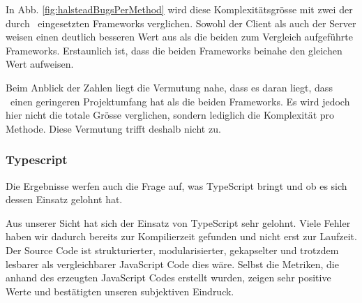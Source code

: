 		In Abb. \ref{fig:halsteadBugsPerMethod} wird diese Komplexitätsgrösse mit zwei der durch \eeppi\ eingesetzten Frameworks verglichen.
		Sowohl der Client als auch der Server weisen einen deutlich besseren Wert aus als die beiden zum Vergleich aufgeführte Frameworks.
		Erstaunlich ist, dass die beiden Frameworks beinahe den gleichen Wert aufweisen.
		
		Beim Anblick der Zahlen liegt die Vermutung nahe, dass es daran liegt,
		dass \eeppi\ einen geringeren Projektumfang hat als die beiden Frameworks.
		Es wird jedoch hier nicht die totale Grösse verglichen, sondern lediglich die Komplexität pro Methode.
		Diese Vermutung trifft deshalb nicht zu.
				
				
	\subsubsection{Typescript}
	Die Ergebnisse werfen auch die Frage auf, was TypeScript bringt und ob es sich dessen Einsatz gelohnt hat.
	
	Aus unserer Sicht hat sich der Einsatz von TypeScript sehr gelohnt. 
	Viele Fehler haben wir dadurch bereits zur Kompilierzeit gefunden und nicht erst zur Laufzeit.
	Der Source Code ist strukturierter, modularisierter, gekapselter und trotzdem lesbarer als vergleichbarer JavaScript Code dies wäre.
	Selbst die Metriken, die anhand des erzeugten JavaScript Codes erstellt wurden, zeigen sehr positive Werte und bestätigten unseren subjektiven Eindruck.	
	
